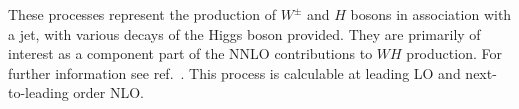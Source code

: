 These processes represent the production of $W^\pm$ and $H$ bosons in
association with a jet, with various decays of the Higgs boson provided.
They are primarily of interest as a component
part of the NNLO contributions to $WH$ production.
For further information see ref.~\cite{Campbell:2016jau}.
This process is calculable at leading LO and next-to-leading order NLO.
